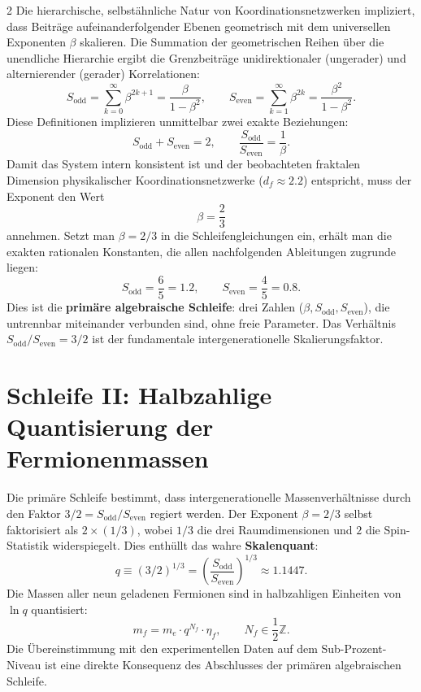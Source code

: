 \documentclass[12pt,a4paper]{article}
\begin{document}
\begin{multicols}{2}
		Die hierarchische, selbstähnliche Natur von Koordinationsnetzwerken impliziert, dass Beiträge aufeinanderfolgender Ebenen geometrisch mit dem universellen Exponenten \(\beta\) skalieren. Die Summation der geometrischen Reihen über die unendliche Hierarchie ergibt die Grenzbeiträge unidirektionaler (ungerader) und alternierender (gerader) Korrelationen:
		\begin{equation}
			S_{\mathrm{odd}} = \sum_{k=0}^{\infty} \beta^{2k+1} = \frac{\beta}{1-\beta^{2}}, \qquad
			S_{\mathrm{even}} = \sum_{k=1}^{\infty} \beta^{2k} = \frac{\beta^{2}}{1-\beta^{2}}.
		\end{equation}
		Diese Definitionen implizieren unmittelbar zwei exakte Beziehungen:
		\begin{equation}
			S_{\mathrm{odd}} + S_{\mathrm{even}} = 2, \qquad \frac{S_{\mathrm{odd}}}{S_{\mathrm{even}}} = \frac{1}{\beta}.
		\end{equation}
		Damit das System intern konsistent ist und der beobachteten fraktalen Dimension physikalischer Koordinationsnetzwerke (\(d_f \approx 2.2\)) entspricht, muss der Exponent den Wert
		\begin{equation}
			\boxed{\beta = \frac{2}{3}}
		\end{equation}
		annehmen. Setzt man \(\beta = 2/3\) in die Schleifengleichungen ein, erhält man die exakten rationalen Konstanten, die allen nachfolgenden Ableitungen zugrunde liegen:
		\begin{equation}
			\boxed{S_{\mathrm{odd}} = \frac{6}{5} = 1.2, \qquad S_{\mathrm{even}} = \frac{4}{5} = 0.8.}
		\end{equation}
		Dies ist die \textbf{primäre algebraische Schleife}: drei Zahlen (\(\beta, S_{\mathrm{odd}}, S_{\mathrm{even}}\)), die untrennbar miteinander verbunden sind, ohne freie Parameter. Das Verhältnis \(S_{\mathrm{odd}}/S_{\mathrm{even}} = 3/2\) ist der fundamentale intergenerationelle Skalierungsfaktor.
		
		\section{Schleife II: Halbzahlige Quantisierung der Fermionenmassen}
		
		Die primäre Schleife bestimmt, dass intergenerationelle Massenverhältnisse durch den Faktor \(3/2 = S_{\mathrm{odd}}/S_{\mathrm{even}}\) regiert werden. Der Exponent \(\beta = 2/3\) selbst faktorisiert als \(2 \times (1/3)\), wobei \(1/3\) die drei Raumdimensionen und \(2\) die Spin-Statistik widerspiegelt. Dies enthüllt das wahre \textbf{Skalenquant}:
		\begin{equation}
			q \equiv (3/2)^{1/3} = \left( \frac{S_{\mathrm{odd}}}{S_{\mathrm{even}}} \right)^{1/3} \approx 1.1447.
		\end{equation}
		Die Massen aller neun geladenen Fermionen sind in halbzahligen Einheiten von \(\ln q\) quantisiert:
		\begin{equation}
			m_f = m_e \cdot q^{N_f} \cdot \eta_f, \qquad N_f \in \frac{1}{2}\mathbb{Z}.
		\end{equation}
		Die Übereinstimmung mit den experimentellen Daten auf dem Sub-Prozent-Niveau ist eine direkte Konsequenz des Abschlusses der primären algebraischen Schleife.
		

\end{multicols}
\end{document}
